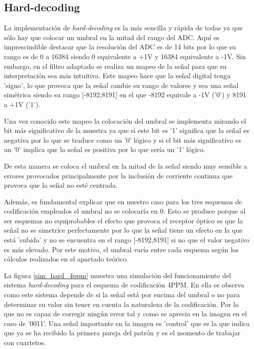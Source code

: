 \subsection{Hard-decoding}
La implementación de \textit{hard-decoding} es la más sencilla y rápida de todas ya que 
sólo hay que colocar un umbral en la mitad del rango del ADC. Aquí es imprescindible
destacar que la resolución del ADC es de 14 bits por lo que su rango es de 0 a 
16384 siendo 0 equivalente a +1V y 16384 equivalente a -1V. Sin embargo, en el filtro 
adaptado se realiza un mapeo de la señal para que su interpretación sea más intuitiva. 
Este mapeo hace que la señal digital tenga 'signo', lo que provoca que la señal cambie su 
rango de valores y sea una señal simétrica siendo su rango [-8192,8191] en el que 
-8192 equivale a -1V ('0') y 8191 a +1V ('1'). 

Una vez conocido este mapeo la colocación del umbral se implementa mirando el bit más 
significativo de la muestra ya que si este bit es '1' significa que la señal es 
negativa por lo que se traduce como un '0' lógico y si el bit más significativo es un 
'0' implica que la señal es positiva por lo que sería un '1' lógico.

De esta manera se coloca el umbral en la mitad de la señal siendo muy sensible a 
errores provocados principalmente por la inclusión de corriente continua que provoca
que la señal no esté centrada.

Además, es fundamental explicar que en nuestro caso para los tres esquemas de 
codificación empleados el umbral no se colocaría en 0. Esto se produce porque al 
ser esquemas no equiprobables el efecto que provoca el receptor óptico es que la 
señal no se simetrice perfectamente por lo que la señal tiene un efecto en la que está
'subida' y no se encuentra en el rango [-8192,8191] si no que el valor negativo es más
elevado. Por este motivo, el umbral varía entre cada esquema según los cálculos 
realizados en el apartado teórico.

La figura \ref{sim_hard_4ppm} muestra una simulación del funcionamiento del sistema 
\textit{hard-decoding} para el esquema de codificación 4PPM. En ella se observa como 
este sistema depende de si la señal está por encima del umbral o no para determinar su 
valor sin tener en cuenta la naturaleza de la codificación. Por lo que no es capaz de 
corregir ningún error tal y como se aprecia en la imagen en el caso de '0011'. Una 
señal importante en la imagen es 'control' que es la que indica que ya se ha recibido la 
primera pareja del patrón y es el momento de trabajar con cuartetos.

